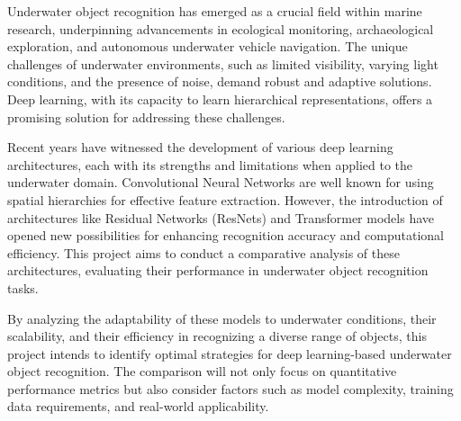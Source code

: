Underwater object recognition has emerged as a crucial field within marine
research, underpinning advancements in ecological monitoring, archaeological
exploration, and autonomous underwater vehicle navigation.
The unique challenges of underwater environments, such as limited visibility,
varying light conditions, and the presence of noise, demand robust and adaptive
solutions.
Deep learning, with its capacity to learn hierarchical representations,
offers a promising solution for addressing these challenges.

Recent years have witnessed the development of various deep learning
architectures, each with its strengths and limitations when applied to the
underwater domain.
Convolutional Neural Networks are well known for
using spatial hierarchies for effective feature extraction.
However, the introduction of architectures like Residual Networks (ResNets)
and Transformer models have opened new possibilities for enhancing recognition
accuracy and computational efficiency.
This project aims to conduct a comparative analysis of these architectures,
evaluating their performance in underwater object recognition tasks.

By analyzing the adaptability of these models to underwater conditions,
their scalability, and their efficiency in recognizing a diverse range of
objects, this project intends to identify optimal strategies
for deep learning-based underwater object recognition.
The comparison will not only focus on quantitative performance metrics but also
consider factors such as model complexity,
training data requirements, and real-world applicability.